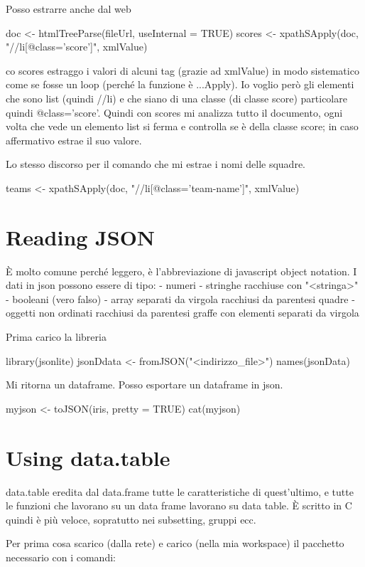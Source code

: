 Posso estrarre anche dal web

doc <- htmlTreeParse(fileUrl, useInternal = TRUE)
scores <- xpathSApply(doc, "//li[@class='score']", xmlValue)

co scores estraggo i valori di alcuni tag (grazie ad xmlValue) in modo sistematico come se fosse un loop (perché la funzione è ...Apply).
Io voglio però gli elementi che sono list (quindi //li) e che siano di una classe (di classe score) particolare quindi @class='score'.
Quindi con scores mi analizza tutto il documento, ogni volta che vede un elemento list si ferma e controlla se è della classe score; in caso affermativo estrae il suo valore.

Lo stesso discorso per il comando che mi estrae i nomi delle squadre.

teams <- xpathSApply(doc, "//li[@class='team-name']", xmlValue)



\section{Reading JSON}

È molto comune perché leggero, è l'abbreviazione di javascript object notation. I dati in json possono essere di tipo:
- numeri
- stringhe racchiuse con "<stringa>"
- booleani (vero falso)
- array separati da virgola racchiusi da parentesi quadre
- oggetti non ordinati racchiusi da parentesi graffe con elementi separati da virgola

Prima carico la libreria 

library(jsonlite)
jsonDdata <- fromJSON("<indirizzo_file>")
names(jsonData)

Mi ritorna un dataframe.
Posso esportare un dataframe in json.

myjson <- toJSON(iris, pretty = TRUE)
cat(myjson)



\section{Using data.table}

data.table eredita dal data.frame tutte le caratteristiche di quest'ultimo, e tutte le funzioni che lavorano su un data frame lavorano su data table.
È scritto in C quindi è più veloce, sopratutto nei subsetting, gruppi ecc.

Per prima cosa scarico (dalla rete) e carico (nella mia workspace) il pacchetto necessario con i comandi:

